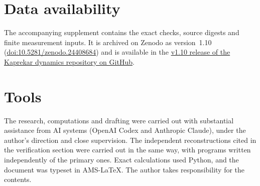 \documentclass[11pt,reqno]{amsart}
\theoremstyle{definition}
\begin{document}
\section*{Data availability}
The accompanying supplement contains the exact checks, source digests and finite measurement inputs. It is
archived on Zenodo as version~1.10
(\href{https://doi.org/10.5281/zenodo.24408684}{doi:10.5281/zenodo.24408684}) and is available in the
\href{https://github.com/galyavin/kaprekar-dynamics/releases/tag/v1.10}{v1.10 release of the Kaprekar dynamics repository on GitHub}.

\section*{Tools}
The research, computations and drafting were carried out with substantial assistance from AI systems (OpenAI Codex and Anthropic Claude), under the author's direction and close supervision. The independent reconstructions cited in the verification section were carried out in the same way, with programs written independently of the primary ones. Exact calculations used Python, and the document was typeset in AMS-LaTeX. The author takes responsibility for the contents.
\end{document}
